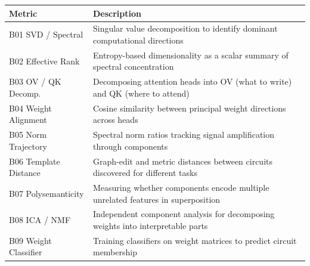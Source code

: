\documentclass{article}
\begin{document}
\begin{minipage}{\linewidth}
\par

\begin{center}

\begin{tabular}{@{}lp{10cm}@{}}
\toprule
\textbf{Metric} & \textbf{Description} \\
\midrule
B01 SVD / Spectral & Singular value decomposition to identify dominant computational directions \\
\midrule
B02 Effective Rank & Entropy-based dimensionality as a scalar summary of spectral concentration \\
\midrule
B03 OV / QK Decomp. & Decomposing attention heads into OV (what to write) and QK (where to attend) \\
\midrule
B04 Weight Alignment & Cosine similarity between principal weight directions across heads \\
\midrule
B05 Norm Trajectory & Spectral norm ratios tracking signal amplification through components \\
\midrule
B06 Template Distance & Graph-edit and metric distances between circuits discovered for different tasks \\
\midrule
B07 Polysemanticity & Measuring whether components encode multiple unrelated features in superposition \\
\midrule
B08 ICA / NMF & Independent component analysis for decomposing weights into interpretable parts \\
\midrule
B09 Weight Classifier & Training classifiers on weight matrices to predict circuit membership \\
\bottomrule
\end{tabular}
\end{center}
\end{minipage}

\smallskip
\end{document}
